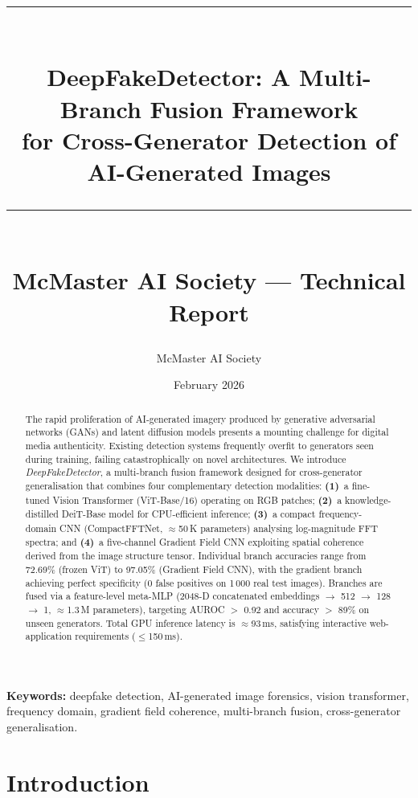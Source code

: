 \documentclass[12pt, a4paper]{article}
\title{
  \vspace{-0.8cm}
  {\color{mcmaster}\rule{\linewidth}{2pt}}\\[0.5em]
  \textbf{DeepFakeDetector: A Multi-Branch Fusion Framework\\
    for Cross-Generator Detection of AI-Generated Images}\\[0.4em]
  {\color{mcmaster}\rule{\linewidth}{1pt}}\\[0.3em]
  \large McMaster AI Society — Technical Report
}
\author[1]{McMaster AI Society}
\affil[1]{%
  Department of Electrical \& Computer Engineering,
  McMaster University, Hamilton, Ontario, Canada
}
\date{February 2026}
\begin{document}

\maketitle
\thispagestyle{fancy}

\begin{abstract}
\noindent
The rapid proliferation of AI-generated imagery produced by generative
adversarial networks (GANs) and latent diffusion models presents a mounting
challenge for digital media authenticity.  Existing detection systems frequently
overfit to generators seen during training, failing catastrophically on novel
architectures.  We introduce \textit{DeepFakeDetector}, a multi-branch fusion
framework designed for cross-generator generalisation that combines four
complementary detection modalities: \textbf{(1)}~a fine-tuned Vision Transformer
(ViT-Base/16) operating on RGB patches; \textbf{(2)}~a knowledge-distilled
DeiT-Base model for CPU-efficient inference; \textbf{(3)}~a compact
frequency-domain CNN (CompactFFTNet, $\approx$50\,K parameters) analysing
log-magnitude FFT spectra; and \textbf{(4)}~a five-channel Gradient Field CNN
exploiting spatial coherence derived from the image structure tensor.  Individual
branch accuracies range from 72.69\% (frozen ViT) to 97.05\% (Gradient Field
CNN), with the gradient branch achieving perfect specificity (0 false positives
on 1\,000 real test images).  Branches are fused via a feature-level meta-MLP
(2048-D concatenated embeddings $\rightarrow$ 512 $\rightarrow$ 128 $\rightarrow$
1, $\approx$1.3\,M parameters), targeting AUROC $>$ 0.92 and accuracy $>$ 89\%
on unseen generators.  Total GPU inference latency is $\approx$93\,ms, satisfying
interactive web-application requirements ($\leq$150\,ms).
\end{abstract}

\noindent\textbf{Keywords:} deepfake detection, AI-generated image forensics,
vision transformer, frequency domain, gradient field coherence, multi-branch
fusion, cross-generator generalisation.

\vspace{0.5em}
\noindent{\color{mcmaster}\rule{\linewidth}{0.8pt}}

\section{Introduction}
\label{sec:intro}
\end{document}
